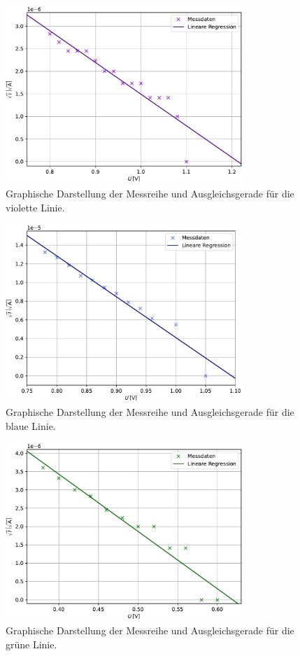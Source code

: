 \begin{figure}[H]
    \centering
    \includegraphics[width=0.8\textwidth]{Plots/violet.pdf}
    \caption{Graphische Darstellung der Messreihe und Ausgleichsgerade für die violette Linie.}
    \label{fig:violet}
\end{figure}
\begin{figure}[H]
    \centering
    \includegraphics[width=0.8\textwidth]{Plots/blau.pdf}
    \caption{Graphische Darstellung der Messreihe und Ausgleichsgerade für die blaue Linie.}
    \label{fig:blau}
\end{figure}
\begin{figure}[H]
    \centering
    \includegraphics[width=0.8\textwidth]{Plots/gruen.pdf}
    \caption{Graphische Darstellung der Messreihe und Ausgleichsgerade für die grüne Linie.}
    \label{fig:gruen}
\end{figure}
